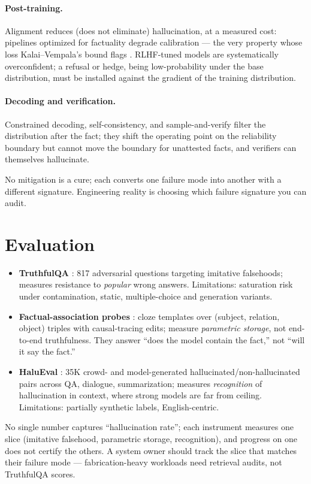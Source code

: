 \documentclass[11pt]{article}
\begin{document}
\paragraph{Post-training.} Alignment reduces (does not eliminate) hallucination, at a measured cost: pipelines optimized for factuality degrade calibration --- the very property whose loss Kalai--Vempala's bound flags \cite{kalai2024calibrated}. RLHF-tuned models are systematically overconfident; a refusal or hedge, being low-probability under the base distribution, must be installed against the gradient of the training distribution.
\paragraph{Decoding and verification.} Constrained decoding, self-consistency, and sample-and-verify filter the distribution after the fact; they shift the operating point on the reliability boundary but cannot move the boundary for unattested facts, and verifiers can themselves hallucinate.

No mitigation is a cure; each converts one failure mode into another with a different signature. Engineering reality is choosing which failure signature you can audit.

\section{Evaluation}
\begin{itemize}[noitemsep]
  \item \textbf{TruthfulQA} \cite{lin2022truthfulqa}: 817 adversarial questions targeting imitative falsehoods; measures resistance to \emph{popular} wrong answers. Limitations: saturation risk under contamination, static, multiple-choice and generation variants.
  \item \textbf{Factual-association probes} \cite{meng2022rome}: cloze templates over (subject, relation, object) triples with causal-tracing edits; measure \emph{parametric storage}, not end-to-end truthfulness. They answer ``does the model contain the fact,'' not ``will it say the fact.''
  \item \textbf{HaluEval} \cite{li2023halueval}: 35K crowd- and model-generated hallucinated/non-hallucinated pairs across QA, dialogue, summarization; measures \emph{recognition} of hallucination in context, where strong models are far from ceiling. Limitations: partially synthetic labels, English-centric.
\end{itemize}
No single number captures ``hallucination rate''; each instrument measures one slice (imitative falsehood, parametric storage, recognition), and progress on one does not certify the others. A system owner should track the slice that matches their failure mode --- fabrication-heavy workloads need retrieval audits, not TruthfulQA scores.
\end{document}
